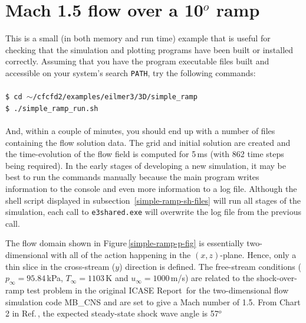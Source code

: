 
\section{Mach 1.5 flow over a 10$^o$ ramp}
\label{simple-ramp-sec}
%
This is a small (in both memory and run time) example 
that is useful for checking that the simulation and
plotting programs have been built or installed correctly.
Assuming that you have the program executable files built and
accessible on your system's search \texttt{PATH}, 
try the following commands:\\
%
\topbar\\
\texttt{\$ cd $\sim$/cfcfd2/examples/eilmer3/3D/simple\_ramp}\\
\texttt{\$ ./simple\_ramp\_run.sh}\\
\bottombar\\
%
And, within a couple of minutes, you should end up with a number of files
containing the flow solution data.
The grid and initial solution are created and the time-evolution of the
flow field is computed for 5\,ms (with 862 time steps being required).
In the early stages of developing a new simulation, it may be best to run the
commands manually because the main program writes information to the console
and even more information to a log file.
Although the shell script displayed in subsection~\ref{simple-ramp-sh-files}
will run all stages of the simulation, each call to \texttt{e3shared.exe}
will overwrite the log file from the previous call.

\medskip
The flow domain shown in Figure\,\ref{simple-ramp-p-fig} is essentially
two-dimensional with all of the action happening in the $(x,z)$-plane.
Hence, only a thin slice in the cross-stream ($y$) direction is defined.
The free-stream conditions ($p_{\infty} = 95.84$\,kPa, $T_{\infty} = 1103$\,K
and $u_{\infty} = 1000$\,m/s) are related to the shock-over-ramp test problem
in the original ICASE Report\,\cite{jacobs_91d} for the two-dimensional flow
simulation code MB\_CNS and are set to give a Mach number of 1.5.
From Chart 2 in Ref.\,\cite{ames_53}, the expected steady-state shock wave
angle is 57$^o$


